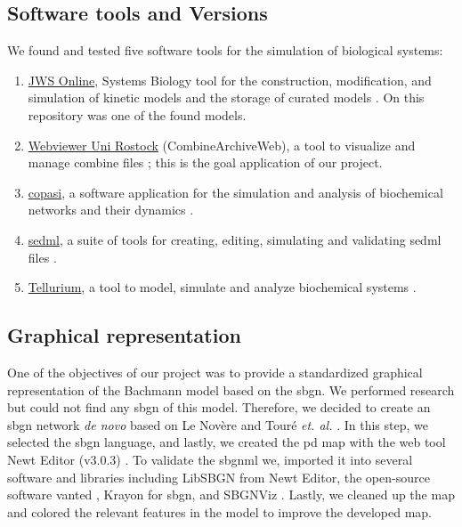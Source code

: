 \subsection*{Software tools and Versions}
We found and tested five software tools for the simulation of biological systems:
\begin{enumerate} 
    \item \hyperlink{https://www.systemsmedicine.net/posts/jws-online-biological-systems-modelling}{JWS Online}, Systems Biology tool for the construction, modification, and simulation of kinetic models and the storage of curated models \cite{jwsonline}. On this repository was one of the found models.
    \item \hyperlink{https://cat.bio.informatik.uni-rostock.de/}{Webviewer Uni Rostock} (CombineArchiveWeb), a tool to visualize and manage \ac{combine} files \cite{combine}; this is the goal application of our project. 
    \item \hyperlink{http://copasi.org/}{\ac{copasi}}, a software application for the simulation and analysis of biochemical networks and their dynamics \cite{copasi}.
    \item \hyperlink{https://sed-ml.org/}{\ac{sedml}}, a suite of tools for creating, editing, simulating and validating \ac{sedml} files \cite{sedml}. 
    \item \hyperlink{https://tellurium.readthedocs.io/en/latest/}{Tellurium},  a tool to model, simulate and analyze biochemical systems \cite{tellurium}.
\end{enumerate}

\subsection*{Graphical representation}
One of the objectives of our project was to provide a standardized graphical representation of the Bachmann model based on the \ac{sbgn}. We performed research but could not find any \ac{sbgn} of this model. Therefore, we decided to create an \ac{sbgn} network \textit{de novo} based on Le Novère \cite{sbgnnovere} and Touré \textit{et. al.} \cite{sbgntoure}. In this step, we selected the \ac{sbgn} language, and lastly, we created the \ac{pd} map with the web tool Newt Editor (v3.0.3) \cite{newteditor}. To validate the \ac{sbgnml} we, imported it into several software and libraries including LibSBGN from Newt Editor, the open-source software \ac{vanted} \cite{vanted}, Krayon for \ac{sbgn}\cite{krayon}, and SBGNViz \cite{sbgnviz}. Lastly, we cleaned up the map and colored the relevant features in the model to improve the developed map.

